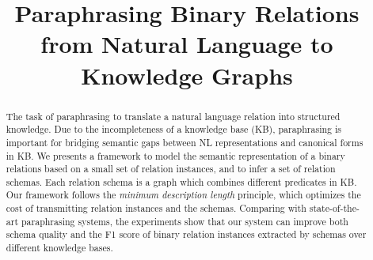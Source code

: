 \documentclass[letterpaper]{article}
\theoremstyle{plain}
\theoremstyle{definition}
\theoremstyle{remark}
\begin{document}
\title{Paraphrasing Binary Relations from Natural Language to Knowledge Graphs}
\maketitle


\begin{abstract}
The task of paraphrasing to translate a natural language relation into structured knowledge.
Due to the incompleteness of a knowledge base (KB), paraphrasing is important for
bridging semantic gaps between NL representations and canonical forms in KB.
We presents a framework to model the semantic representation of a binary relations based on
a small set of relation instances, and to infer a set of relation schemas.
Each relation schema is a graph which combines different predicates in KB.
Our framework follows the \textit{minimum description length} principle, which optimizes the
cost of transmitting relation instances and the schemas.
Comparing with state-of-the-art paraphrasing systems, the experiments show that our system can improve
both schema quality and the F1 score of binary relation instances extracted by schemas over different knowledge bases.

\end{abstract}










%
%







\end{document}
